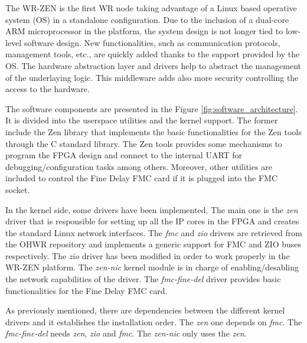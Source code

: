 The WR-ZEN is the first WR node taking advantage of a Linux 
based operative system (OS) in a standalone configuration. Due to the inclusion of a dual-core ARM 
microprocessor in the platform, the system design is not longer tied to 
low-level software design. New functionalities, such as communication 
protocols, management tools, etc., are quickly added thanks to the support 
provided by the OS. The hardware abstraction layer and drivers help to abstract 
the management of the underlaying logic. This middleware adds also more 
security controlling the access to the hardware.

The software components are presented in the Figure \ref{fig:software_architecture}.
It is divided into the userspace utilities and the kernel support. 
The former include the Zen library that implements the basic functionalities for the Zen tools through the C standard library. The Zen tools provides some mechanisms to program the FPGA
design and connect to the internal UART for debugging/configuration tasks among others. 
Moreover, other utilities are included to control the Fine Delay FMC card if it is plugged into the FMC socket.

In the kernel side, some drivers have been implemented. The main one is the \textit{zen}
driver that is responsible for setting up all the IP cores in the FPGA and creates the 
standard Linux network interfaces. The \textit{fmc} and \textit{zio} drivers are retrieved from the 
OHWR repository and implements a generic support for FMC and ZIO buses respectively. 
The \textit{zio} driver has been modified in order to work properly in the WR-ZEN platform.
The \textit{zen-nic} kernel module is in charge of enabling/desabling the network capabilities of 
the  driver. The \textit{fmc-fine-del} driver provides basic functionalities for the Fine Delay FMC card.

As previously mentioned, there are dependencies between the different kernel drivers and it establishes the installation order. The \textit{zen} one depends on \textit{fmc}. The \textit{fmc-fine-del} needs \textit{zen}, \textit{zio} and \textit{fmc}. The \textit{zen-nic} only uses the \textit{zen}.

